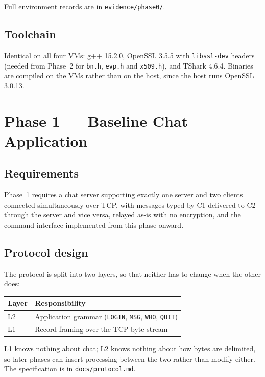 \documentclass[11pt,a4paper]{article}
\begin{document}
Full environment records are in \texttt{evidence/phase0/}.

\subsection{Toolchain}

Identical on all four VMs: g++ 15.2.0, OpenSSL 3.5.5 with \texttt{libssl-dev} headers (needed from
Phase~2 for \texttt{bn.h}, \texttt{evp.h} and \texttt{x509.h}), and TShark 4.6.4. Binaries are
compiled on the VMs rather than on the host, since the host runs OpenSSL 3.0.13.

\section{Phase 1 --- Baseline Chat Application}

\subsection{Requirements}

Phase~1 requires a chat server supporting exactly one server and two clients connected
simultaneously over TCP, with messages typed by C1 delivered to C2 through the server and vice
versa, relayed as-is with no encryption, and the command interface implemented from this phase
onward.

\subsection{Protocol design}
\label{sec:proto}

The protocol is split into two layers, so that neither has to change when the other does:

\begin{center}
\small
\begin{tabular}{@{}ll@{}}
\toprule
\textbf{Layer} & \textbf{Responsibility} \\
\midrule
L2 & Application grammar (\texttt{LOGIN}, \texttt{MSG}, \texttt{WHO}, \texttt{QUIT}) \\
L1 & Record framing over the TCP byte stream \\
\bottomrule
\end{tabular}
\end{center}

L1 knows nothing about chat; L2 knows nothing about how bytes are delimited, so later phases can
insert processing between the two rather than modify either. The specification is in
\texttt{docs/protocol.md}.
\end{document}

